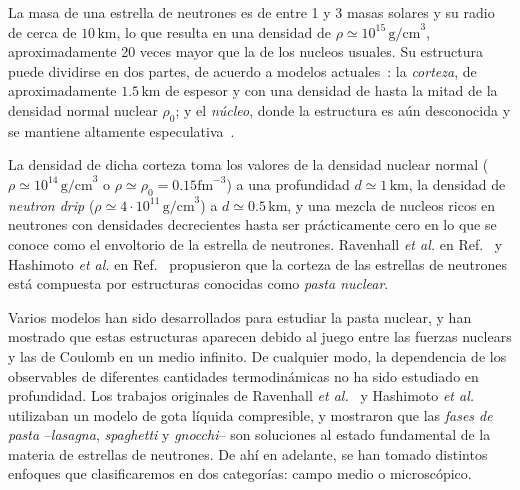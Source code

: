 La masa de una estrella de neutrones es de entre 1 y 3 masas solares y su radio de cerca de $10\,\text{km}$, lo que resulta en una densidad de $\rho \simeq 10^{15}\,\text{g/cm}^3$, aproximadamente 20 veces mayor que la de los nucleos usuales.
Su estructura puede dividirse en dos partes, de acuerdo a modelos actuales~\cite{page_minimal_2004, geppert_temperature_2004}: la \emph{corteza}, de aproximadamente $1.5\,\text{km}$ de espesor y con una densidad de hasta la mitad de la densidad normal nuclear $\rho_0$; y el \emph{núcleo}, donde la estructura es aún desconocida y se mantiene altamente especulativa~\cite{akmal_equation_1998, ravenhall_structure_1983, oyamatsu_nuclear_1993, woosley_physics_2005}.

La densidad de dicha corteza toma los valores de la densidad nuclear normal ($\rho \simeq 10^{14}\,\text{g/cm}^3$ o $ \rho \simeq \rho_0=0.15 \text{fm}^{-3}$) a una profundidad $d \simeq 1\,\text{km}$, la densidad de \emph{neutron drip} ($\rho\simeq 4 \cdot 10^{11}\,\text{g/cm}^3$) a $d\simeq 0.5\,\text{km}$, y una mezcla de nucleos ricos en neutrones con densidades decrecientes hasta ser prácticamente cero en lo que se conoce como el envoltorio de la estrella de neutrones.
Ravenhall \emph{et al.} en Ref.~\cite{ravenhall_structure_1983} y Hashimoto \emph{et al.} en Ref.~\cite{hashimoto_shape_1984} propusieron que la corteza de las estrellas de neutrones está compuesta por estructuras conocidas como \emph{pasta nuclear}.

Varios modelos han sido desarrollados para estudiar la pasta nuclear, y han mostrado que estas estructuras aparecen debido al juego entre las fuerzas nuclears y las de Coulomb en un medio infinito.
De cualquier modo, la dependencia de los observables de diferentes cantidades termodinámicas no ha sido estudiado en profundidad.
Los trabajos originales de Ravenhall \emph{et al.}~\cite{ravenhall_structure_1983} y Hashimoto \emph{et al.}~\cite{hashimoto_shape_1984} utilizaban un modelo de gota líquida compresible, y mostraron que las \emph{fases de pasta}
--\emph{lasagna}, \emph{spaghetti} y \emph{gnocchi}-- son soluciones al estado fundamental de la materia de estrellas de neutrones.
De ahí en adelante, se han tomado distintos enfoques que clasificaremos en dos categorías: campo medio o microscópico.


